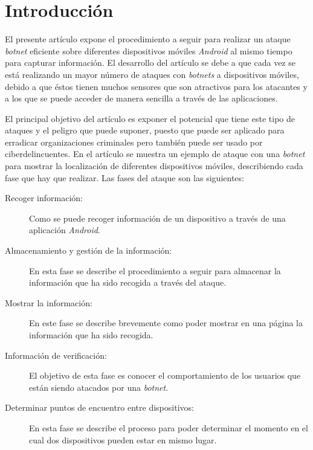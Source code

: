 \documentclass[a4paper,11pt]{report}
\begin{document}
\chapter{Introducción}\label{Introduccion}

El presente artículo expone el procedimiento a seguir para realizar un ataque \emph{botnet} eficiente sobre diferentes dispositivos móviles \emph{Android} al mismo tiempo para capturar información. El desarrollo del artículo se debe a que cada vez se está realizando un mayor número de ataques con \emph{botnets} a dispositivos móviles, debido a que éstos tienen muchos sensores que son atractivos para los atacantes y a los que se puede acceder de manera sencilla a través de las aplicaciones. 

El principal objetivo del artículo es exponer el potencial que tiene este tipo de ataques y el peligro que puede suponer, puesto que puede ser aplicado para erradicar organizaciones criminales pero también puede ser usado por ciberdelincuentes. En el artículo se muestra un ejemplo de ataque con una \emph{botnet} para mostrar la localización de diferentes dispositivos móviles, describiendo cada fase que hay que realizar. Las fases del ataque son las siguientes:

 
\begin{description}
\item [Recoger información:] Como se puede recoger información de un dispositivo a través de una aplicación \emph{Android}.

\item [Almacenamiento y gestión de la información:] En esta fase se describe el procedimiento a seguir para almacenar la información que ha sido recogida a través del ataque. 

\item [Mostrar la información:] En este fase se describe brevemente como poder mostrar en una página la información que ha sido recogida. 

\item [Información de verificación:] El objetivo de esta fase es conocer el comportamiento de los usuarios que están siendo atacados por una \emph{botnet}. 

\item [Determinar puntos de encuentro entre dispositivos:] En esta fase se describe el proceso para poder determinar el momento en el cual dos dispositivos pueden estar en mismo lugar. 

\end{description}
\end{document}
